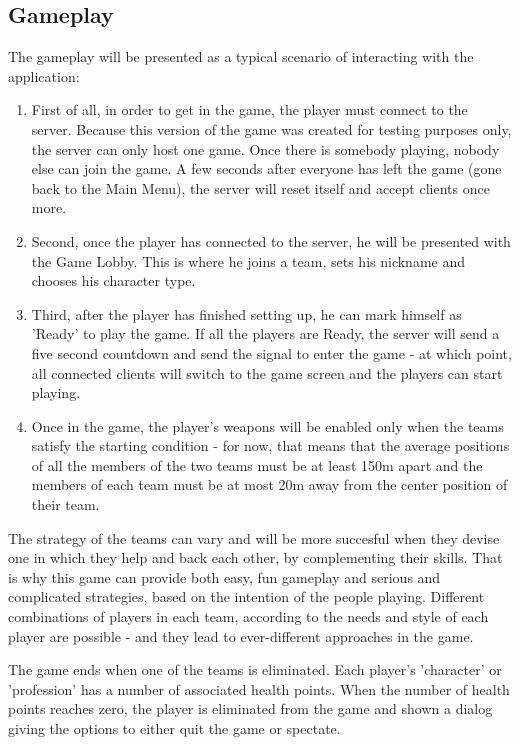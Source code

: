 \subsection{Gameplay}

The gameplay will be presented as a typical scenario of interacting with the
application:

\begin{enumerate}
  \item First of all, in order to get in the game, the player must connect to
  the server. Because this version of the game was created for testing purposes
  only, the server can only host one game. Once there is somebody playing,
  nobody else can join the game. A few seconds after everyone has left the game
  (gone back to the Main Menu), the server will reset itself and accept clients
  once more.
  
  \item Second, once the player has connected to the server, he will be
  presented with the Game Lobby. This is where he joins a team, sets his
  nickname and chooses his character type.

  \item Third, after the player has finished setting up, he can mark himself as
  'Ready' to play the game. If all the players are Ready, the server will send a
  five second countdown and send the signal to enter the game - at which point,
  all connected clients will switch to the game screen and the players can
  start playing.
  
  \item Once in the game, the player's weapons will be enabled only when the
  teams satisfy the starting condition - for now, that means that the average
  positions of all the members of the two teams must be at least 150m apart and
  the members of each team must be at most 20m away from the center position of
  their team.
 
\end{enumerate}

The strategy of the teams can vary and will be more succesful when they devise
one in which they help and back each other, by complementing their skills. That
is why this game can provide both easy, fun gameplay and serious and complicated
strategies, based on the intention of the people playing. Different combinations
of players in each team, according to the needs and style of each player are
possible - and they lead to ever-different approaches in the game.\newline

The game ends when one of the teams is eliminated. Each player's 'character' or
'profession' has a number of associated health points. When the number of health
points reaches zero, the player is eliminated from the game and shown a dialog
giving the options to either quit the game or spectate.\newline

